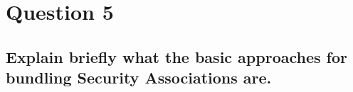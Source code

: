 \documentclass{report}
\begin{document}
	\section{Question 5}
	\startsection
		\renewcommand{\thesubsection}{\thesection.\Alph{subsection}}
		\subsection{Explain briefly what the basic approaches for bundling Security Associations are.}
		\startsubsection
		\closesection
	\closesection
\end{document}
